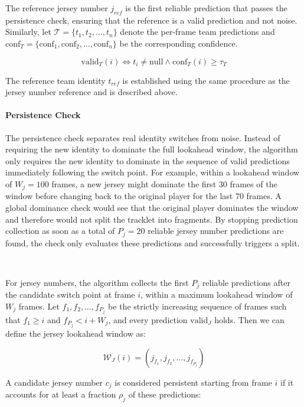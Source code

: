 The reference jersey number $j_{ref}$ is the first reliable prediction that passes the persistence check, ensuring that the reference is a valid prediction and not noise. Similarly, let $\mathcal{T}=\{t_1,t_2,\dots,t_n\}$ denote the per-frame team predictions and $\text{conf}_T=\{\text{conf}_1,\text{conf}_2,\dots,\text{conf}_n\}$ be the corresponding confidence. 

\begin{equation} \label{valid_t}
    \text{valid}_T(i) \iff t_i \neq \text{null} \land \text{conf}_T(i) \geq \tau_T
\end{equation}

The reference team identity $t_{ref}$ is established using the same procedure as the jersey number reference and is described above.

\paragraph{Persistence Check}
The persistence check separates real identity switches from noise. Instead of requiring the new identity to dominate the full lookahead window, the algorithm only requires the new identity to dominate in the sequence of valid predictions immediately following the switch point. For example, within a lookahead window of $W_j=100$ frames, a new jersey might dominate the first 30 frames of the window before changing back to the original player for the last 70 frames. A global dominance check would see that the original player dominates the window and therefore would not split the tracklet into fragments. By stopping prediction collection as soon as a total of $P_j=20$ reliable jersey number predictions are found, the check only evaluates these predictions and successfully triggers a split.

\

For jersey numbers, the algorithm collects the first $P_j$ reliable predictions after the candidate switch point at frame $i$, within a maximum lookahead window of $W_j$ frames. Let $f_{1},f_{2},\dots,f_{P_j}$ be the strictly increasing sequence of frames such that $f_1 \geq i$ and $f_{P_j} < i+W_j$, and every prediction $\text{valid}_J$ holds. Then we can define the jersey lookahead window as:

\begin{equation}
    \mathcal{W}_J(i)=(j_{f_1}, j_{f_2}, \dots,j_{f_{P_j}})
\end{equation}

A candidate jersey number $c_j$ is considered persistent starting from frame $i$ if it accounts for at least a fraction $\rho_j$ of these predictions:

